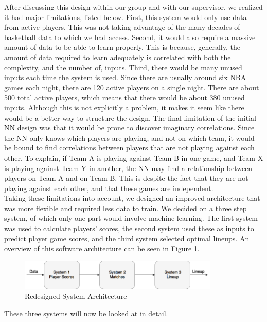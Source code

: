 After discussing this design within our group and with our supervisor, we realized it had major limitations, listed below. First, this system would only use data from active players. This was not taking advantage of the many decades of basketball data to which we had access. Second, it would also require a massive amount of data to be able to learn properly. This is because, generally, the amount of data required to learn adequately is correlated with both the complexity, and the number of, inputs. %
Third, there would be many unused inputs each time the system is used. Since there are usually around six NBA games each night, there are 120 active players on a single night. There are about 500 total active players, which means that there would be about 380 unused inputs. Although this is not explicitly a problem, it makes it seem like there would be a better way to structure the design. The final limitation of the initial NN design was that it would be prone to discover imaginary correlations. 
Since the NN only knows which players are playing, and not on which team, it would be bound to find correlations between players that are not playing against each other. To explain, if Team A is playing against Team B in one game, and Team X is playing against Team Y in another, the NN may find a relationship between players on Team A and on Team B. This is despite the fact that they are not playing against each other, and that these games are independent.\\
Taking these limitations into account, we designed an improved architecture that was more flexible and required less data to train. We decided on a three step system, of which only one part would involve machine learning. The first system was used to calculate players' scores, the second system used these as inputs to predict player game scores, and the third system selected optimal lineups. An overview of this software architecture can be seen in Figure \ref{fig:second_iteration}.
\begin{figure}[ht]
    \centering
    \includegraphics[width=0.85\textwidth]{figures/second_iteration}
    \caption{Redesigned System Architecture}
    \label{fig:second_iteration}
\end{figure}

These three systems will now be looked at in detail.

